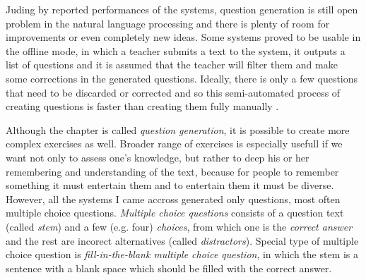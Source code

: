 \documentclass[a4paper, 12pt, twoside]{fithesis2}		%
\renewcommand{\_}{\leavevmode \kern0.07em\vbox{\hrule width0.4em}}
\newcounter{choice}
\begin{document}
Juding by reported performances of the systems, question generation is still open problem in the natural language processing and there is plenty of room for improvements or even completely new ideas.
Some systems proved to be usable in the offline mode, in which a teacher submits a text to the system, it outputs a list of questions and it is assumed that the teacher will filter them and make some corrections in the generated questions. Ideally, there is only a few questions that need to be discarded or corrected and so this semi-automated process of creating questions is faster than creating them fully manually
\cite{question-gen-mitkov}.

Although the chapter is called \textit{question generation},
it is possible to create more complex exercises as well.
Broader range of exercises is especially usefull if we want not only to assess one's knowledge, but rather to deep his or her remembering and understanding of the text,
because for people to remember something it must  entertain them and to entertain them it must be diverse.
However, all the systems I came accross generated only questions, most often multiple choice questions.
\textit{Multiple choice questions} consists of a question text (called \textit{stem})
and a few (e.g. four) \textit{choices}, from which one is the \textit{correct answer}
and the rest are incorect alternatives (called \textit{distractors}).
Special type of multiple choice question is \textit{fill-in-the-blank multiple choice question},
in which the stem is a sentence with a blank space which should be filled with the correct answer.
\end{document}
